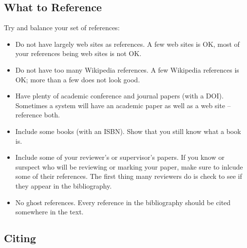 \subsection{What to Reference}

Try and balance your set of references:
\begin{itemize}
\item Do not have largely web sites as references.
  A few web sites is OK, most of your references being web sites
  is not OK.

\item Do not have too many Wikipedia references. A few Wikipedia
  references is OK; more than a few does not look good.

\item Have plenty of academic conference and journal papers (with a
  DOI). Sometimes a system will have an academic paper as well as a
  web site -- reference both.

\item Include some books (with an ISBN). Show that you still
  know what a book is.
 
\item Include some of your reviewer's or supervisor's papers.  If you
  know or surspect who will be reviewing or marking your paper, make
  sure to inlcude some of their references. The first thing many
  reviewers do is check to see if they appear in the bibliography.

\item No ghost references. Every reference in the bibliography should
  be cited somewhere in the text.

\end{itemize}






\subsection{Citing}

